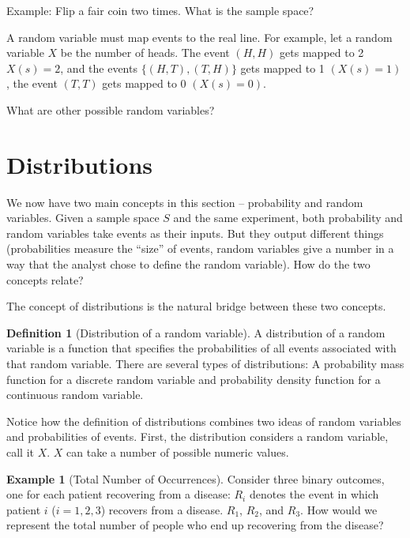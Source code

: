 \documentclass[
]{book}
\theoremstyle{definition}
\newtheorem{definition}{Definition}[chapter]
\theoremstyle{definition}
\newtheorem{example}{Example}[chapter]
\theoremstyle{definition}
\theoremstyle{definition}
\theoremstyle{remark}
\begin{document}
Example: Flip a fair coin two times. What is the sample space?

A random variable must map events to the real line. For example, let a random variable \(X\) be the number of heads. The event \((H, H)\) gets mapped to 2 \(X(s) = 2\), and the events \(\{(H, T), (T, H)\}\) gets mapped to 1 \((X(s) = 1)\), the event \((T, T)\) gets mapped to 0 \((X(s) = 0)\).

What are other possible random variables?

\hypertarget{distributions}{%
\section{Distributions}\label{distributions}}

We now have two main concepts in this section -- probability and random variables. Given a sample space \(S\) and the same experiment, both probability and random variables take events as their inputs. But they output different things (probabilities measure the ``size'' of events, random variables give a number in a way that the analyst chose to define the random variable). How do the two concepts relate?

The concept of distributions is the natural bridge between these two concepts.

\begin{definition}[Distribution of a random variable]
\protect\hypertarget{def:unnamed-chunk-259}{}{\label{def:unnamed-chunk-259} {} }A distribution of a random variable is a function that specifies the probabilities of all events associated with that random variable. There are several types of distributions: A probability mass function for a discrete random variable and probability density function for a continuous random variable.
\end{definition}

Notice how the definition of distributions combines two ideas of random variables and probabilities of events. First, the distribution considers a random variable, call it \(X\). \(X\) can take a number of possible numeric values.

\begin{example}[Total Number of Occurrences]
\protect\hypertarget{exm:unnamed-chunk-260}{}{\label{exm:unnamed-chunk-260} {} }
Consider three binary outcomes, one for each patient recovering from a disease: \(R_i\) denotes the event in which patient \(i\) (\(i = 1, 2, 3\)) recovers from a disease. \(R_1\), \(R_2\), and \(R_3\). How would we represent the total number of people who end up recovering from the disease?
\end{example}
\end{document}
